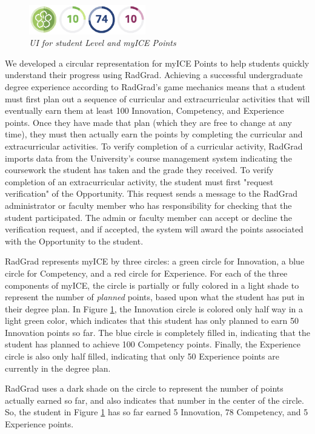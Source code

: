 \documentclass[acmsmall]{acmart}
\begin{document}
\begin{figure}[t]
\centering
\includegraphics[width=2in]{images/ice-pane.eps}
\caption{\em UI for student Level and myICE Points}
\label{fig:ice}
\end{figure}

We developed a circular representation for myICE Points to help students quickly understand their progress using RadGrad.  Achieving a successful undergraduate degree experience according to RadGrad's game mechanics means that a student must first plan out a sequence of curricular and extracurricular activities that will eventually earn them at least 100 Innovation, Competency, and Experience points. Once they have made that plan (which they are free to change at any time), they must then actually earn the points by completing the curricular and extracurricular activities. To verify completion of a curricular activity, RadGrad imports data from the University's course management system indicating the coursework the student has taken and the grade they received.  To verify completion of an extracurricular activity, the student must first "request verification" of the Opportunity.  This request sends a message to the RadGrad administrator or faculty member who has responsibility for checking that the student participated. The admin or faculty member can accept or decline the verification request, and if accepted, the system will award the points associated with the Opportunity to the student.

RadGrad represents myICE by three circles: a green circle for Innovation, a blue circle for Competency, and a red circle for Experience. For each of the three components of myICE, the circle is partially or fully colored in a light shade to represent the number of {\em planned} points, based upon what the student has put in their degree plan. In Figure \ref{fig:ice}, the Innovation circle is colored only half way in a light green color, which indicates that this student has only planned to earn 50 Innovation points so far.  The blue circle is completely filled in, indicating that the student has planned to achieve 100 Competency points.  Finally, the Experience circle is also only half filled, indicating that only 50 Experience points are currently in the degree plan.

RadGrad uses a dark shade on the circle to represent the number of points actually earned so far, and also indicates that number in the center of the circle. So, the student in Figure \ref{fig:ice} has so far earned 5 Innovation, 78 Competency, and 5 Experience points.
\end{document}
